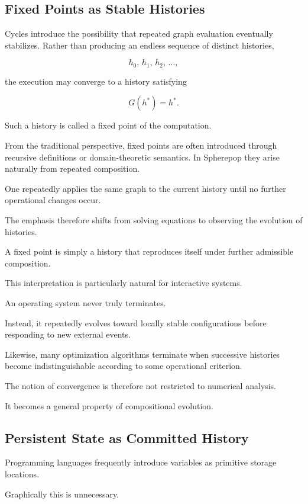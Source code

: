 \documentclass[12pt,oneside]{article}
\begin{document}
\subsection{Fixed Points as Stable Histories}

Cycles introduce the possibility that repeated graph evaluation eventually stabilizes. Rather than producing an endless sequence of distinct histories,

\[
h_0,\,
h_1,\,
h_2,\,
\ldots,
\]

the execution may converge to a history satisfying

\[
G(h^*) = h^*.
\]

Such a history is called a fixed point of the computation.

From the traditional perspective, fixed points are often introduced through recursive definitions or domain-theoretic semantics. In Spherepop they arise naturally from repeated composition.

One repeatedly applies the same graph to the current history until no further operational changes occur.

The emphasis therefore shifts from solving equations to observing the evolution of histories.

A fixed point is simply a history that reproduces itself under further admissible composition.

This interpretation is particularly natural for interactive systems.

An operating system never truly terminates.

Instead, it repeatedly evolves toward locally stable configurations before responding to new external events.

Likewise, many optimization algorithms terminate when successive histories become indistinguishable according to some operational criterion.

The notion of convergence is therefore not restricted to numerical analysis.

It becomes a general property of compositional evolution.

\subsection{Persistent State as Committed History}

Programming languages frequently introduce variables as primitive storage locations.

Graphically this is unnecessary.
\end{document}
